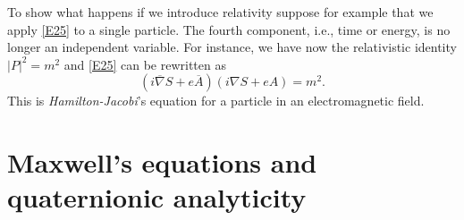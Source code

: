 \documentclass [12pt,a4paper      ]{article}
\newcommand{\CON}{\overline}          %
\begin{document}
     To show what happens if we introduce relativity suppose  for 
example that  we apply \eqref{E25} to  a  single  particle.  The  fourth 
component,  i.e.,  time  or  energy,  is no longer an  independent 
variable.  For  instance,  we have now the relativistic  identity 
$|P|^2 = m^2$  and \eqref{E25} can be rewritten as
%
\begin{equation}\label{E30}
   (i \CON{\nabla} S + e \CON{A}) (i \nabla S + e A) =  m^2.   %
\end{equation}
%
This is \emph{Hamilton-Jacobi}'s  equation for a  particle in an 
electromagnetic field.


\section{Maxwell's equations and quaternionic analyticity}
\label{max:0}
\end{document}
